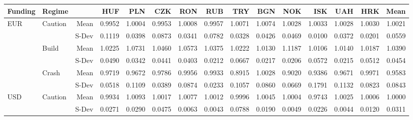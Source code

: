 \documentclass[12pt, a4paper, oneside]{article} %
\begin{document}


\begin{landscape}
\begin{table}[ht]
\centering
\begin{tabular}{llrrrrrrrrrrrrr}
  \hline
 Funding&Regime& & HUF & PLN & CZK & RON & RUB & TRY & BGN & NOK & ISK & UAH & HRK & Mean\\ 
 \hline
  \hline
\multirow{6}{*}{EUR}&\multirow{2}{*}{Caution}&Mean & 0.9952 & 1.0004 & 0.9953 & 1.0008 & 0.9957 & 1.0071 & 1.0074 & 1.0028 & 1.0033 & 1.0028 & 1.0030 & 1.0021\\ 
  &&S-Dev & 0.1119 & 0.0398 & 0.0873 & 0.0341 & 0.0782 & 0.0328 & 0.0426 & 0.0469 & 0.0100 & 0.0372 & 0.0201 & 0.0559\\ 
  & \multirow{2}{*}{Build} & Mean & 1.0225 & 1.0731 & 1.0460 & 1.0573 & 1.0375 & 1.0222 & 1.0130 & 1.1187 & 1.0106 & 1.0140 & 1.0187 &1.0390 \\
  && S-Dev & 0.0490 & 0.0342 & 0.0441 & 0.0403 & 0.0212 & 0.0667 & 0.0217 & 0.0206 & 0.0572 & 0.0215 & 0.0512 & 0.0454\\ 
  & \multirow{2}{*}{Crash} & Mean & 0.9719 & 0.9672 & 0.9786 & 0.9956 & 0.9933 & 0.8915 & 1.0028 & 0.9020 & 0.9386 & 0.9671 & 0.9971 & 0.9583\\ 
  && S-Dev & 0.0518 & 0.1109 & 0.0389 & 0.0874 & 0.0233 & 0.1057 & 0.0860 & 0.0669 & 0.1791 & 0.1132 & 0.0823 & 0.0843\\ 
\hline
\multirow{6}{*}{USD}& \multirow{2}{*}{Caution} & Mean   & 0.9934 & 1.0093 & 1.0017 & 1.0077 & 1.0012 & 0.9996 & 1.0045 & 1.0004 & 0.9743 & 1.0025 & 1.0006 & 1.0000\\ 
  && S-Dev & 0.0271 & 0.0290 & 0.0475 & 0.0063 & 0.0043 & 0.0788 & 0.0190 & 0.0049 & 0.0226 & 0.0044 & 0.0120 & 0.0311\\ 

\end{tabular}
\end{table}
\end{landscape}
\end{document}
